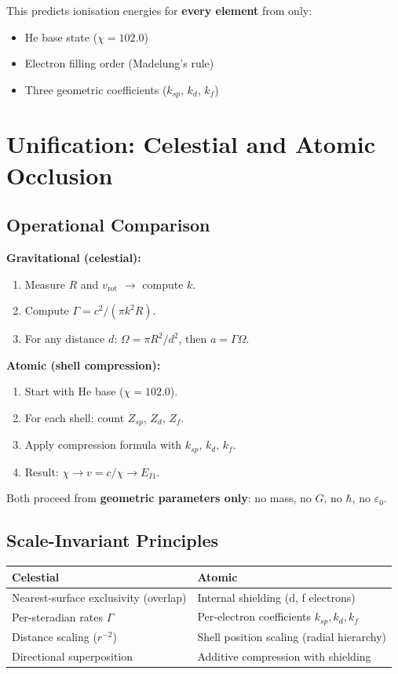 This predicts ionisation energies for \textbf{every element} from only:
\begin{itemize}
  \item He base state ($\chi = 102.0$)
  \item Electron filling order (Madelung's rule)
  \item Three geometric coefficients ($k_{sp}$, $k_d$, $k_f$)
\end{itemize}


\section{Unification: Celestial and Atomic Occlusion}

\subsection{Operational Comparison}

\textbf{Gravitational (celestial):}
\begin{enumerate}
  \item Measure $R$ and $v_{\text{rot}}$ $\to$ compute $k$.
  \item Compute $\Gamma = c^2/(\pi k^2 R)$.
  \item For any distance $d$: $\Omega = \pi R^2/d^2$, then $a = \Gamma\Omega$.
\end{enumerate}

\textbf{Atomic (shell compression):}
\begin{enumerate}
  \item Start with He base ($\chi = 102.0$).
  \item For each shell: count $Z_{sp}$, $Z_d$, $Z_f$.
  \item Apply compression formula with $k_{sp}$, $k_d$, $k_f$.
  \item Result: $\chi \to v = c/\chi \to E_{I1}$.
\end{enumerate}

Both proceed from \textbf{geometric parameters only}: no mass, no $G$, no $\hbar$, no $\varepsilon_0$.

\subsection{Scale-Invariant Principles}

\begin{center}
\begin{tabular}{ll}
\hline
\textbf{Celestial} & \textbf{Atomic} \\
\hline
Nearest-surface exclusivity (overlap) & Internal shielding (d, f electrons) \\
Per-steradian rates $\Gamma$ & Per-electron coefficients $k_{sp}, k_d, k_f$ \\
Distance scaling ($r^{-2}$) & Shell position scaling (radial hierarchy) \\
Directional superposition & Additive compression with shielding \\
\hline
\end{tabular}
\end{center}

